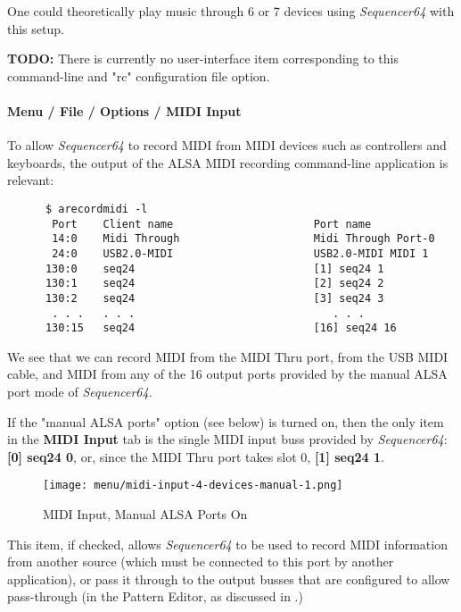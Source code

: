    One could theoretically play music through 6 or 7 devices using
   \textsl{Sequencer64} with this setup.

   \textbf{TODO:} 
   There is currently no user-interface item corresponding to this command-line
   and "rc" configuration file option.

\paragraph{Menu / File / Options / MIDI Input}
\label{paragraph:seq64_menu_file_options_midi_input}

   To allow \textsl{Sequencer64} to record MIDI from MIDI devices such as
   controllers and keyboards, the output of the ALSA MIDI recording
   command-line application is relevant:

   \begin{verbatim}
      $ arecordmidi -l
       Port    Client name                      Port name
       14:0    Midi Through                     Midi Through Port-0
       24:0    USB2.0-MIDI                      USB2.0-MIDI MIDI 1
      130:0    seq24                            [1] seq24 1
      130:1    seq24                            [2] seq24 2
      130:2    seq24                            [3] seq24 3
       . . .   . . .                               . . .
      130:15   seq24                            [16] seq24 16
   \end{verbatim}

   We see that we can record MIDI from the MIDI Thru port, from the USB MIDI
   cable, and MIDI from any of the 16 output ports provided by the manual ALSA
   port mode of \textsl{Sequencer64}.

   If the "manual ALSA ports" option (see below) is turned on,
   then the only item in the \textbf{MIDI Input} tab is the single MIDI input
   buss provided by \textsl{Sequencer64}:  \textbf{[0] seq24 0}, or, since
   the MIDI Thru port takes slot 0, \textbf{[1] seq24 1}.

\begin{figure}[H]
   \centering 
   \texttt{[image: menu/midi-input-4-devices-manual-1.png]}
   \caption{MIDI Input, Manual ALSA Ports On}
   \label{fig:seq64_midi_input_4_devices_manual_1}
\end{figure}

   This item, if checked, allows \textsl{Sequencer64} to be used to record MIDI
   information from another source (which must be connected to this port by
   another application), or pass it through to the output busses
   that are configured to allow pass-through
   (in the Pattern Editor, as discussed in 
   .)

